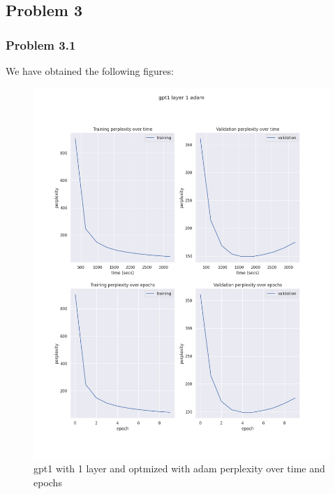 \documentclass[12pt]{article}
\theoremstyle{definition}
\begin{document}
\subsection*{Problem 3}
\subsubsection*{Problem 3.1}
We have obtained the following figures:

\begin{figure}[H]
     \centering
     \includegraphics[scale=0.4]{gpt1_layer_1_adam.png}
     \caption{gpt1 with 1 layer and optmized with adam perplexity over time and epochs}
\end{figure}
\end{document}

